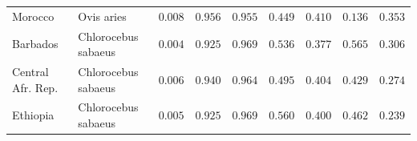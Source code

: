 \documentclass{article}
\providecommand{\DIFaddtex}[1]{{\protect\color{blue}\uwave{#1}}} %
\providecommand{\DIFdeltex}[1]{{\protect\color{red}\sout{#1}}}                      %
\providecommand{\DIFaddFL}[1]{\DIFadd{#1}} %
\providecommand{\DIFdelFL}[1]{\DIFdel{#1}} %
\providecommand{\DIFaddbeginFL}{} %
\providecommand{\DIFaddendFL}{} %
\providecommand{\DIFdelbeginFL}{} %
\providecommand{\DIFdelendFL}{} %
\providecommand{\DIFadd}[1]{\texorpdfstring{\DIFaddtex{#1}}{#1}} %
\providecommand{\DIFdel}[1]{\texorpdfstring{\DIFdeltex{#1}}{}} %
\newcommand{\DIFscaledelfig}{0.5}
\newlength{\DIFdelgraphicswidth} %
\newlength{\DIFdelgraphicsheight} %
\newcommand{\DIFaddincludegraphics}[2][]{{\color{blue}\fbox{\DIFOincludegraphics[#1]{#2}}}} %
\newcommand{\DIFdelincludegraphics}[2][]{%
\sbox{\DIFdelgraphicsbox}{\DIFOincludegraphics[#1]{#2}}%
\settoboxwidth{\DIFdelgraphicswidth}{\DIFdelgraphicsbox} %
\settoboxtotalheight{\DIFdelgraphicsheight}{\DIFdelgraphicsbox} %
\scalebox{\DIFscaledelfig}{%
\parbox[b]{\DIFdelgraphicswidth}{\usebox{\DIFdelgraphicsbox}\\[-\baselineskip] \rule{\DIFdelgraphicswidth}{0em}}\llap{\resizebox{\DIFdelgraphicswidth}{\DIFdelgraphicsheight}{%
\setlength{\unitlength}{\DIFdelgraphicswidth}%
\begin{picture}(1,1)%
\thicklines\linethickness{2pt} %
{\color[rgb]{1,0,0}\put(0,0){\framebox(1,1){}}}%
{\color[rgb]{1,0,0}\put(0,0){\line( 1,1){1}}}%
{\color[rgb]{1,0,0}\put(0,1){\line(1,-1){1}}}%
\end{picture}%
}\hspace*{3pt}}} %
} %
\DeclareRobustCommand{\DIFaddbeginFL}{\DIFOaddbeginFL \let\includegraphics\DIFaddincludegraphics} %
\DeclareRobustCommand{\DIFaddendFL}{\DIFOaddendFL \let\includegraphics\DIFOincludegraphics} %
\DeclareRobustCommand{\DIFdelbeginFL}{\DIFOdelbeginFL \let\includegraphics\DIFdelincludegraphics} %
\DeclareRobustCommand{\DIFdelendFL}{\DIFOaddendFL \let\includegraphics\DIFOincludegraphics} %
\begin{document}
\begin{table}[tb]
\begin{adjustbox}{width=\textwidth}
\begin{tabular}{||l|l|r||r|r||r|r||r|r||}
                Morocco & Ovis aries & \DIFdelbeginFL \DIFdelFL{$ 0.008$ }\DIFdelendFL \DIFaddbeginFL \DIFaddFL{$ 4\times 10^{5}$ }\DIFaddendFL & \DIFdelbeginFL \DIFdelFL{$ 0.956$ }\DIFdelendFL \DIFaddbeginFL \DIFaddFL{$ 0.962$ }\DIFaddendFL & \DIFdelbeginFL \DIFdelFL{$ 0.955$ }\DIFdelendFL \DIFaddbeginFL \DIFaddFL{$ 0.961$ }\DIFaddendFL & \DIFdelbeginFL \DIFdelFL{$ 0.449$ }\DIFdelendFL \DIFaddbeginFL \DIFaddFL{$ 0.462$ }\DIFaddendFL & \DIFdelbeginFL \DIFdelFL{$ 0.410$ }\DIFdelendFL \DIFaddbeginFL \DIFaddFL{$ 0.424$ }\DIFaddendFL & \DIFdelbeginFL \DIFdelFL{$ 0.136$ }\DIFdelendFL \DIFaddbeginFL \DIFaddFL{$ 0.211$ }\DIFaddendFL & \DIFdelbeginFL \DIFdelFL{$ 0.353$ }\DIFdelendFL \DIFaddbeginFL \DIFaddFL{$ 0.514$ }\DIFaddendFL \\
                \rowcolor{LIGHTGREY} Barbados & Chlorocebus sabaeus & \DIFdelbeginFL \DIFdelFL{$ 0.004$ }\DIFdelendFL \DIFaddbeginFL \DIFaddFL{$1.1\times 10^{5}$ }\DIFaddendFL & \DIFdelbeginFL \DIFdelFL{$ 0.925$ }\DIFdelendFL \DIFaddbeginFL \DIFaddFL{$ 0.935$ }\DIFaddendFL & \DIFdelbeginFL \DIFdelFL{$ 0.969$ }\DIFdelendFL \DIFaddbeginFL \DIFaddFL{$ 0.975$ }\DIFaddendFL & \DIFdelbeginFL \DIFdelFL{$ 0.536$ }\DIFdelendFL \DIFaddbeginFL \DIFaddFL{$ 0.565$ }\DIFaddendFL & \DIFdelbeginFL \DIFdelFL{$ 0.377$ }\DIFdelendFL \DIFaddbeginFL \DIFaddFL{$ 0.402$ }\DIFaddendFL & \DIFdelbeginFL \DIFdelFL{$ 0.565$ }\DIFdelendFL \DIFaddbeginFL \DIFaddFL{$ 0.648$ }\DIFaddendFL & \DIFdelbeginFL \DIFdelFL{$ 0.306$ }\DIFdelendFL \DIFaddbeginFL \DIFaddFL{$ 0.293$ }\DIFaddendFL \\
                \rowcolor{LIGHTGREY} Central Afr. Rep. & Chlorocebus sabaeus & \DIFdelbeginFL \DIFdelFL{$ 0.006$ }\DIFdelendFL \DIFaddbeginFL \DIFaddFL{$1.7\times 10^{5}$ }\DIFaddendFL & \DIFdelbeginFL \DIFdelFL{$ 0.940$ }\DIFdelendFL \DIFaddbeginFL \DIFaddFL{$ 0.948$ }\DIFaddendFL & \DIFdelbeginFL \DIFdelFL{$ 0.964$ }\DIFdelendFL \DIFaddbeginFL \DIFaddFL{$ 0.971$ }\DIFaddendFL & \DIFdelbeginFL \DIFdelFL{$ 0.495$ }\DIFdelendFL \DIFaddbeginFL \DIFaddFL{$ 0.508$ }\DIFaddendFL & \DIFdelbeginFL \DIFdelFL{$ 0.404$ }\DIFdelendFL \DIFaddbeginFL \DIFaddFL{$ 0.423$ }\DIFaddendFL & \DIFdelbeginFL \DIFdelFL{$ 0.429$ }\DIFdelendFL \DIFaddbeginFL \DIFaddFL{$ 0.535$ }\DIFaddendFL & \DIFdelbeginFL \DIFdelFL{$ 0.274$ }\DIFdelendFL \DIFaddbeginFL \DIFaddFL{$ 0.275$ }\DIFaddendFL \\
                \rowcolor{LIGHTGREY} Ethiopia & Chlorocebus sabaeus & \DIFdelbeginFL \DIFdelFL{$ 0.005$ }\DIFdelendFL \DIFaddbeginFL \DIFaddFL{$1.4\times 10^{5}$ }\DIFaddendFL & \DIFdelbeginFL \DIFdelFL{$ 0.925$ }\DIFdelendFL \DIFaddbeginFL \DIFaddFL{$ 0.935$ }\DIFaddendFL & \DIFdelbeginFL \DIFdelFL{$ 0.969$ }\DIFdelendFL \DIFaddbeginFL \DIFaddFL{$ 0.975$ }\DIFaddendFL & \DIFdelbeginFL \DIFdelFL{$ 0.560$ }\DIFdelendFL \DIFaddbeginFL \DIFaddFL{$ 0.580$ }\DIFaddendFL & \DIFdelbeginFL \DIFdelFL{$ 0.400$ }\DIFdelendFL \DIFaddbeginFL \DIFaddFL{$ 0.416$ }\DIFaddendFL & \DIFdelbeginFL \DIFdelFL{$ 0.462$ }\DIFdelendFL \DIFaddbeginFL \DIFaddFL{$ 0.552$ }\DIFaddendFL & \DIFdelbeginFL \DIFdelFL{$ 0.239$ }\DIFdelendFL \DIFaddbeginFL \DIFaddFL{$ 0.245$ }\DIFaddendFL \\

\end{tabular}
\end{adjustbox}
\end{table}
\end{document}
